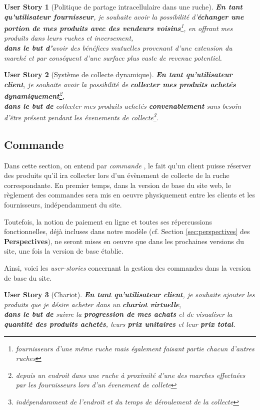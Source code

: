 \documentclass[a4paper,12pt]{book}
\theoremstyle{break}
\newtheorem*{userStory}{User Story}
\theoremstyle{break}
\theoremstyle{break}
\theoremstyle{break}
\theoremstyle{definition}
\theoremstyle{remark}
\begin{document}
\begin{userStory}[Politique de partage intracellulaire dans une ruche]
\textbf{En tant qu'utilisateur {\color{red}fournisseur}}, je souhaite avoir la possibilité d'\textbf{échanger une portion de mes produits avec des vendeurs voisins}\footnote{fournisseurs d'une même ruche mais également faisant partie chacun d'autres ruches}, en offrant mes produits dans leurs ruches et inversement,\\
\indent
\textbf{dans le but d'}avoir des bénéfices mutuelles provenant d'une extension du marché et par conséquent d'une surface plus vaste de revenue potentiel.
\end{userStory}

\begin{userStory}[Système de collecte dynamique]
\textbf{En tant qu'utilisateur {\color{green}client}}, je souhaite avoir la possibilité de \textbf{collecter mes produits achetés dynamiquement}\footnote{depuis un endroit dans une ruche à proximité d'une des marches effectuées par les fournisseurs lors d'un évenement de collete},\\
\indent
\textbf{dans le but de} collecter mes produits achetés \textbf{convenablement} sans besoin d'être présent pendant les évenements de collecte\footnote{indépendamment de l'endroit et du temps de déroulement de la collecte}.
\end{userStory}

\subsection{Commande}
Dans cette section, on entend par \og \textit{commande} \fg , le fait qu'un client puisse réserver des produits qu'il ira collecter lors d'un évènement de collecte de la ruche correspondante. En premier temps, dans la version de base du site web, le règlement des commandes sera mis en oeuvre physiquement entre les clients et les fournisseurs, indépendamment du site.

Toutefois, la notion de paiement en ligne et toutes ses répercussions fonctionnelles, déjà incluses dans notre modèle (cf. Section \ref{sec:perspectives} des \textbf{Perspectives}), ne seront mises en oeuvre que dans les prochaines versions du site, une fois la version de base établie.

Ainsi, voici les \textit{user-stories} concernant la gestion des commandes dans la version de base du site.

\begin{userStory}[Chariot]
\textbf{En tant qu'utilisateur {\color{green}client}}, je souhaite ajouter les produits que je désire acheter dans un \textbf{chariot virtuelle},\\
\indent
\textbf{dans le but de} suivre la \textbf{progression de mes achats} et de visualiser la \textbf{quantité des produits achetés}, leurs \textbf{prix unitaires} et leur \textbf{prix total}.
\end{userStory}
\end{document}
